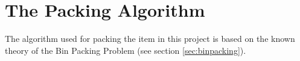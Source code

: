 \section{The Packing Algorithm}
\label{sec:algorithm}
The algorithm used for packing the item in this project is based on the known theory of the Bin Packing Problem (see section \ref{sec:binpacking}). \citep{three-dim-pack}